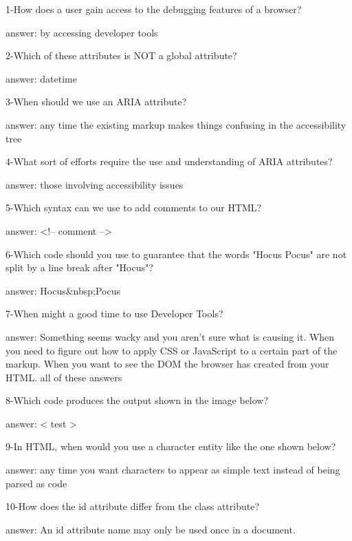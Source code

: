 1-How does a user gain access to the debugging features of a browser?

answer: by accessing developer tools

2-Which of these attributes is NOT a global attribute?

answer: datetime

3-When should we use an ARIA attribute?

answer: any time the existing markup makes things confusing in the accessibility tree

4-What sort of efforts require the use and understanding of ARIA attributes?

answer: those involving accessibility issues

5-Which syntax can we use to add comments to our HTML?

answer: <!-- comment -->

6-Which code should you use to guarantee that the words "Hocus Pocus" are not split by a line break after "Hocus"?

answer: Hocus&nbsp;Pocus

7-When might a good time to use Developer Tools?

answer: 
Something seems wacky and you aren't sure what is causing it.
When you need to figure out how to apply CSS or JavaScript to a certain part of the markup.
When you want to see the DOM the browser has created from your HTML.
all of these answers

8-Which code produces the output shown in the image below? 

answer: < test >

9-In HTML, when would you use a character entity like the one shown below? 

answer: any time you want characters to appear as simple text instead of being parsed as code

10-How does the id attribute differ from the class attribute?

answer: An id attribute name may only be used once in a document.
